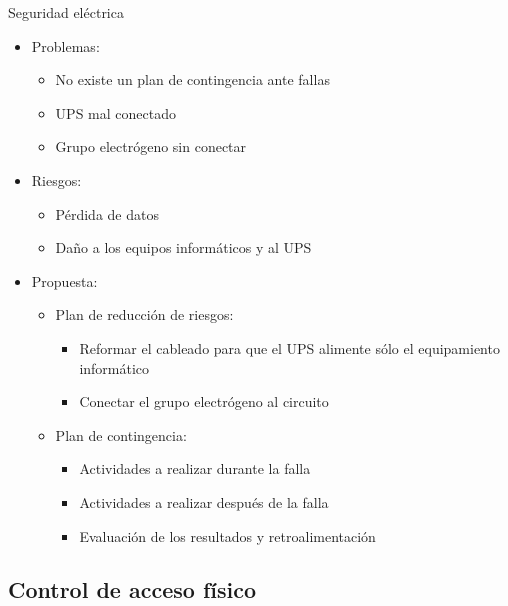 \documentclass[spanish]{beamer}
\begin{document}
\begin{frame}{Seguridad eléctrica}
  \begin{itemize}
  \item Problemas:
    \begin{itemize}
    \item No existe un plan de contingencia ante fallas
    \item UPS mal conectado
    \item Grupo electrógeno sin conectar
    \end{itemize}
  \item Riesgos:
    \begin{itemize}
    \item Pérdida de datos
    \item Daño a los equipos informáticos y al UPS
    \end{itemize}
  \item Propuesta:
    \begin{itemize}
    \item Plan de reducción de riesgos:
      \begin{itemize}
      \item Reformar el cableado para que el UPS alimente sólo el equipamiento informático
      \item Conectar el grupo electrógeno al circuito
      \end{itemize}
    \item Plan de contingencia: %
      \begin{itemize}
      \item Actividades a realizar durante la falla
      \item Actividades a realizar después de la falla
      \item Evaluación de los resultados y retroalimentación %
      \end{itemize}
    \end{itemize}
  \end{itemize}
\end{frame}


\subsection{Control de acceso físico}
\end{document}
